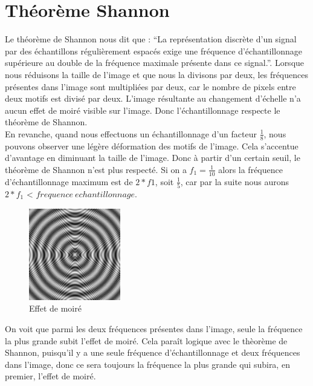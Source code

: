 \documentclass[a4paper,11pt]{article}
\begin{document}
  \section{Théorème Shannon}
  Le théorème de Shannon nous dit que : \enquote{La représentation discrète d'un signal par des échantillons régulièrement espacés exige une fréquence d'échantillonnage 
  supérieure au double de la fréquence maximale présente dans ce signal.}. Lorsque nous réduisons la taille de l’image et que nous la divisons par deux, les fréquences 
  présentes dans l’image sont multipliées par deux, car le nombre de pixels entre deux motifs est divisé par deux. L’image résultante au changement d’échelle n’a aucun effet 
  de moiré visible sur l’image. Donc l’échantillonnage respecte le théorème de Shannon.\\

  En revanche, quand nous effectuons un échantillonnage d’un facteur $\frac{1}{8}$, nous pouvons observer une légère déformation des motifs de l’image. Cela s’accentue 
  d’avantage en diminuant la taille de l’image. Donc à partir d’un certain seuil, le théorème de Shannon n’est plus respecté. 
  Si on a $f_1=\frac{1}{10}$ alors la fréquence d'échantillonnage maximum est de $2*f1$, soit $\frac{1}{5}$, car par la suite nous aurons $2*f_1$ < $frequence\ echantillonnage$.\\
  
  \begin{figure}[H]
   \centering
   \includegraphics[width=4cm]{../128_moire.png}
   \caption{Effet de moiré}
  \end{figure}

  On voit que parmi les deux fréquences présentes dans l’image, seule la fréquence 
  la plus grande subit l’effet de moiré. Cela paraît logique avec le thèorème de Shannon, 
  puisqu’il y a une seule fréquence d’échantillonnage et deux fréquences dans l’image, 
  donc ce sera toujours la fréquence la plus grande qui subira, en premier, l’effet de moiré.\\
\end{document}
